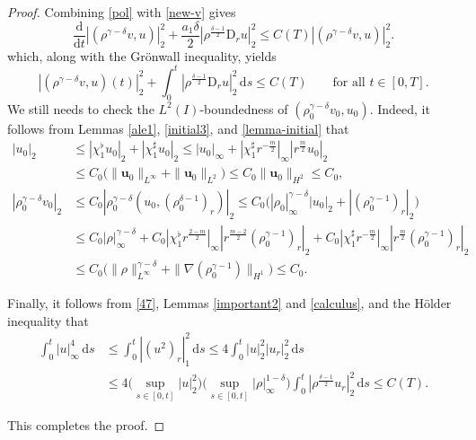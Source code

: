 \documentclass[11pt,reqno]{amsart}
\numberwithin{rk}{section}
\numberwithin{prop}{section}
\numberwithin{mydef}{section}
\numberwithin{lem}{section}
\numberwithin{equation}{section}
\numberwithin{thm}{section}
\begin{document}
\begin{proof}
Combining \eqref{pol} with \eqref{new-v} gives
\begin{equation*} 
\frac{\mathrm{d}}{\mathrm{d}t}|(\rho^{\gamma-\delta} v,u)|_2^2+ \frac{a_1\delta}{2} |\rho^\frac{\delta-1}{2}\mathrm{D}_r u|_2^2\leq  C(T)|(\rho^{\gamma-\delta} v,u)|_2^2. 
\end{equation*}
which, along with the Gr\"onwall inequality, yields
\begin{equation}\label{47}
|(\rho^{\gamma-\delta} v,u)(t)|_2^2 + \int_0^t |\rho^\frac{\delta-1}{2}\mathrm{D}_r u|_2^2\,\mathrm{d}s\leq  C(T)\qquad\text{for all $t\in [0,T]$}.
\end{equation}
We still needs to check the $L^2(I)$-boundedness of $(\rho_0^{\gamma-\delta} v_0,u_0)$. 
Indeed, it follows from Lemmas \ref{ale1}, \ref{initial3}, and \ref{lemma-initial} that
\begin{align*}
|u_0|_2&\leq |\chi_1^\flat u_0|_2+|\chi_1^\sharp u_0|_2\leq |u_0|_\infty+|\chi_1^\sharp r^{-\frac{m}{2}}|_\infty |r^\frac{m}{2}u_0|_2 \\
&\leq C_0\big(\|\boldsymbol{u}_0\|_{L^\infty}+\|\boldsymbol{u}_0\|_{L^2}\big)\leq C_0\|\boldsymbol{u}_0\|_{H^2}\leq C_0,\\[1mm]
|\rho_0^{\gamma-\delta} v_0|_2&\leq C_0|\rho_0^{\gamma-\delta}(u_0,(\rho_0^{\delta-1})_r)|_2\leq C_0\big(|\rho_0|_\infty^{\gamma-\delta}|u_0|_2+ |(\rho_0^{\gamma-1})_r|_2\big) \\
&\leq C_0|\rho|_{\infty}^{\gamma-\delta}+C_0|\chi_1^\flat r^\frac{2-m}{2} |_\infty |r^\frac{m-2}{2}(\rho_0^{\gamma-1})_r|_2+C_0|\chi_1^\sharp r^{-\frac{m}{2}}|_\infty |r^\frac{m}{2} (\rho_0^{\gamma-1})_r|_2\\
&\leq C_0\big(\|\rho\|_{L^\infty}^{\gamma-\delta}+\|\nabla (\rho_0^{\gamma-1})\|_{H^1}\big) \leq C_0.
\end{align*}
 
Finally, it follows from \eqref{47}, Lemmas \ref{important2} and \ref{calculus}, and the H\"older inequality that 
\begin{equation*}
\begin{aligned}
\int_0^t |u|_\infty^4\,\mathrm{d}s&\leq \int_0^t |(u^2)_r|_1^2 \,\mathrm{d}s\leq 4\int_0^t |u|_2^2|u_r|_2^2 \,\mathrm{d}s\\
&\leq 4\Big(\sup_{s\in [0,t]}|u|_2^2\Big)\Big(\sup_{s\in [0,t]}|\rho|_\infty^{1-\delta}\Big)\int_0^t |\rho^\frac{\delta-1}{2}u_r|_2^2 \,\mathrm{d}s\leq C(T).
\end{aligned}
\end{equation*}

This completes the proof.
\end{proof}
\end{document}
